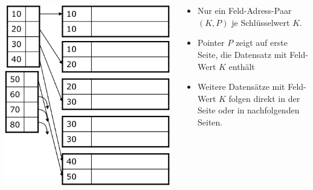 \begin{frame}{\insertsection}
\framesubtitle{\insertsubsection}
\\[4pt]
\begin{columns}[T]
\begin{column}{.33\textwidth}
\includegraphics[scale=0.23]{img/Index_NonKey_Primary-Simple-1.png}
\end{column}
\begin{column}{.67\textwidth}
\begin{itemize}
\item Nur ein Feld-Adress-Paar $(K,P)$ je Schl\"usselwert $K$. 
\item Pointer $P$ zeigt auf erste Seite, die Datensatz mit Feld-Wert $K$ enth\"alt  
\item Weitere Datens\"atze mit Feld-Wert $K$ folgen direkt in der Seite oder in nachfolgenden Seiten.
\end{itemize}
\end{column}
\end{columns}
\end{frame}

